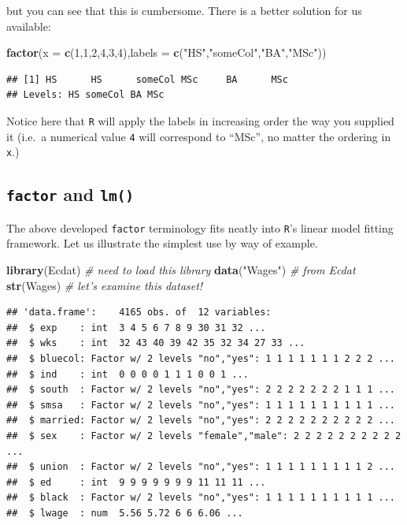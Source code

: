 \documentclass[]{book}
\newenvironment{Shaded}{\begin{snugshade}}{\end{snugshade}}
\newcommand{\KeywordTok}[1]{\textcolor[rgb]{0.13,0.29,0.53}{\textbf{#1}}}
\newcommand{\DataTypeTok}[1]{\textcolor[rgb]{0.13,0.29,0.53}{#1}}
\newcommand{\DecValTok}[1]{\textcolor[rgb]{0.00,0.00,0.81}{#1}}
\newcommand{\StringTok}[1]{\textcolor[rgb]{0.31,0.60,0.02}{#1}}
\newcommand{\CommentTok}[1]{\textcolor[rgb]{0.56,0.35,0.01}{\textit{#1}}}
\newcommand{\NormalTok}[1]{#1}
\theoremstyle{definition}
\theoremstyle{definition}
\theoremstyle{definition}
\theoremstyle{remark}
\begin{document}
but you can see that this is cumbersome. There is a better solution for
us available:

\begin{Shaded}
\begin{Highlighting}[]
\KeywordTok{factor}\NormalTok{(}\DataTypeTok{x =} \KeywordTok{c}\NormalTok{(}\DecValTok{1}\NormalTok{,}\DecValTok{1}\NormalTok{,}\DecValTok{2}\NormalTok{,}\DecValTok{4}\NormalTok{,}\DecValTok{3}\NormalTok{,}\DecValTok{4}\NormalTok{),}\DataTypeTok{labels =} \KeywordTok{c}\NormalTok{(}\StringTok{"HS"}\NormalTok{,}\StringTok{"someCol"}\NormalTok{,}\StringTok{"BA"}\NormalTok{,}\StringTok{"MSc"}\NormalTok{))}
\end{Highlighting}
\end{Shaded}

\begin{verbatim}
## [1] HS      HS      someCol MSc     BA      MSc    
## Levels: HS someCol BA MSc
\end{verbatim}

Notice here that \texttt{R} will apply the labels in increasing order
the way you supplied it (i.e.~a numerical value \texttt{4} will
correspond to ``MSc'', no matter the ordering in \texttt{x}.)

\subsection{\texorpdfstring{\texttt{factor} and
\texttt{lm()}}{factor and lm()}}\label{factor-and-lm}

The above developed \texttt{factor} terminology fits neatly into
\texttt{R}'s linear model fitting framework. Let us illustrate the
simplest use by way of example.

\begin{Shaded}
\begin{Highlighting}[]
\KeywordTok{library}\NormalTok{(Ecdat)  }\CommentTok{# need to load this library}
\KeywordTok{data}\NormalTok{(}\StringTok{"Wages"}\NormalTok{)   }\CommentTok{# from Ecdat}
\KeywordTok{str}\NormalTok{(Wages)   }\CommentTok{# let's examine this dataset!}
\end{Highlighting}
\end{Shaded}

\begin{verbatim}
## 'data.frame':    4165 obs. of  12 variables:
##  $ exp    : int  3 4 5 6 7 8 9 30 31 32 ...
##  $ wks    : int  32 43 40 39 42 35 32 34 27 33 ...
##  $ bluecol: Factor w/ 2 levels "no","yes": 1 1 1 1 1 1 1 2 2 2 ...
##  $ ind    : int  0 0 0 0 1 1 1 0 0 1 ...
##  $ south  : Factor w/ 2 levels "no","yes": 2 2 2 2 2 2 2 1 1 1 ...
##  $ smsa   : Factor w/ 2 levels "no","yes": 1 1 1 1 1 1 1 1 1 1 ...
##  $ married: Factor w/ 2 levels "no","yes": 2 2 2 2 2 2 2 2 2 2 ...
##  $ sex    : Factor w/ 2 levels "female","male": 2 2 2 2 2 2 2 2 2 2 ...
##  $ union  : Factor w/ 2 levels "no","yes": 1 1 1 1 1 1 1 1 1 2 ...
##  $ ed     : int  9 9 9 9 9 9 9 11 11 11 ...
##  $ black  : Factor w/ 2 levels "no","yes": 1 1 1 1 1 1 1 1 1 1 ...
##  $ lwage  : num  5.56 5.72 6 6 6.06 ...
\end{verbatim}
\end{document}
